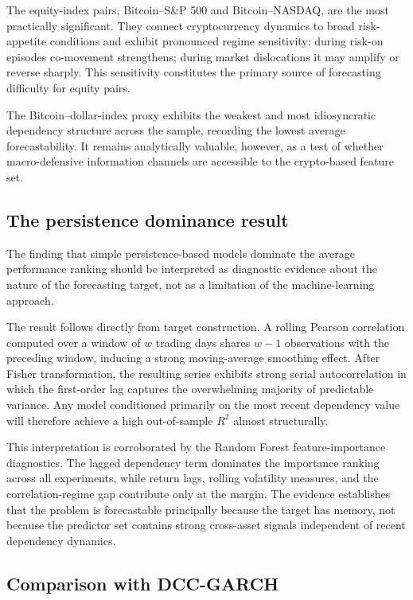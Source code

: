 The equity-index pairs, Bitcoin--S\&P 500 and Bitcoin--NASDAQ, are the most practically significant. They connect cryptocurrency dynamics to broad risk-appetite conditions and exhibit pronounced regime sensitivity: during risk-on episodes co-movement strengthens; during market dislocations it may amplify or reverse sharply. This sensitivity constitutes the primary source of forecasting difficulty for equity pairs.

The Bitcoin--dollar-index proxy exhibits the weakest and most idiosyncratic dependency structure across the sample, recording the lowest average forecastability. It remains analytically valuable, however, as a test of whether macro-defensive information channels are accessible to the crypto-based feature set.

\subsection{The persistence dominance result}

The finding that simple persistence-based models dominate the average performance ranking should be interpreted as diagnostic evidence about the nature of the forecasting target, not as a limitation of the machine-learning approach.

The result follows directly from target construction. A rolling Pearson correlation computed over a window of $w$ trading days shares $w-1$ observations with the preceding window, inducing a strong moving-average smoothing effect. After Fisher transformation, the resulting series exhibits strong serial autocorrelation in which the first-order lag captures the overwhelming majority of predictable variance. Any model conditioned primarily on the most recent dependency value will therefore achieve a high out-of-sample $R^2$ almost structurally.

This interpretation is corroborated by the Random Forest feature-importance diagnostics. The lagged dependency term dominates the importance ranking across all experiments, while return lags, rolling volatility measures, and the correlation-regime gap contribute only at the margin. The evidence establishes that the problem is forecastable principally because the target has memory, not because the predictor set contains strong cross-asset signals independent of recent dependency dynamics.

\subsection{Comparison with DCC-GARCH}

